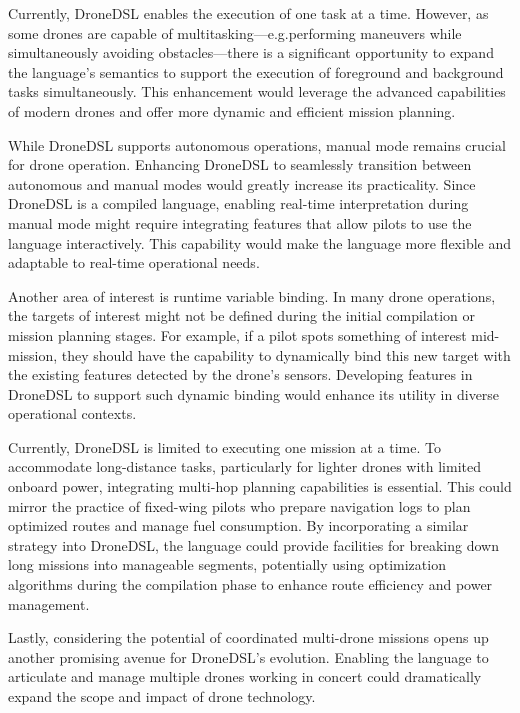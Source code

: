 Currently, DroneDSL enables the execution of one task at a time. However, as some drones are capable of multitasking—e.g.performing maneuvers while simultaneously avoiding obstacles—there is a significant opportunity to expand the language's semantics to support the execution of foreground and background tasks simultaneously. This enhancement would leverage the advanced capabilities of modern drones and offer more dynamic and efficient mission planning.

While DroneDSL supports autonomous operations, manual mode remains crucial for drone operation. Enhancing DroneDSL to seamlessly transition between autonomous and manual modes would greatly increase its practicality. Since DroneDSL is a compiled language, enabling real-time interpretation during manual mode might require integrating features that allow pilots to use the language interactively. This capability would make the language more flexible and adaptable to real-time operational needs.

Another area of interest is runtime variable binding. In many drone operations, the targets of interest might not be defined during the initial compilation or mission planning stages. For example, if a pilot spots something of interest mid-mission, they should have the capability to dynamically bind this new target with the existing features detected by the drone's sensors. Developing features in DroneDSL to support such dynamic binding would enhance its utility in diverse operational contexts.

Currently, DroneDSL is limited to executing one mission at a time. To accommodate long-distance tasks, particularly for lighter drones with limited onboard power, integrating multi-hop planning capabilities is essential. This could mirror the practice of fixed-wing pilots who prepare navigation logs to plan optimized routes and manage fuel consumption. By incorporating a similar strategy into DroneDSL, the language could provide facilities for breaking down long missions into manageable segments, potentially using optimization algorithms during the compilation phase to enhance route efficiency and power management.

Lastly, considering the potential of coordinated multi-drone missions opens up another promising avenue for DroneDSL's evolution. Enabling the language to articulate and manage multiple drones working in concert could dramatically expand the scope and impact of drone technology.